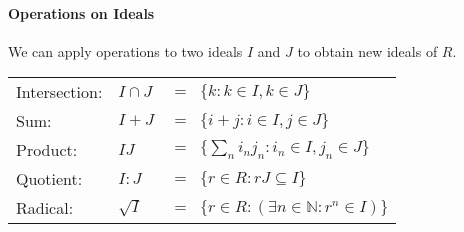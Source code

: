 






\paragraph{Operations on Ideals} We can apply operations to two ideals $I$ and $J$ to obtain new ideals of $R$.

\medskip
\begin{tabular}{l l l}
Intersection:  & $I \cap J$& $ = \;\; \{k : k \in I, k \in J\}$  \\
Sum:           & $I + J$   & $ = \;\; \{i + j : i \in I, j \in J\}$  \\
Product:       & $I J$     & $ = \;\; \{\sum_n i_n j_n : i_n \in I, j_n \in J\}$  \\
Quotient:      & $I:J$     & $ = \;\;  \{r \in R : r J \subseteq I\}$  \\
Radical:       & $\sqrt{I}$& $ = \;\; \{ r \in R : (\exists n \in \mathbb{N} :  r^n \in I) \}$  \\
\end{tabular}
\medskip


